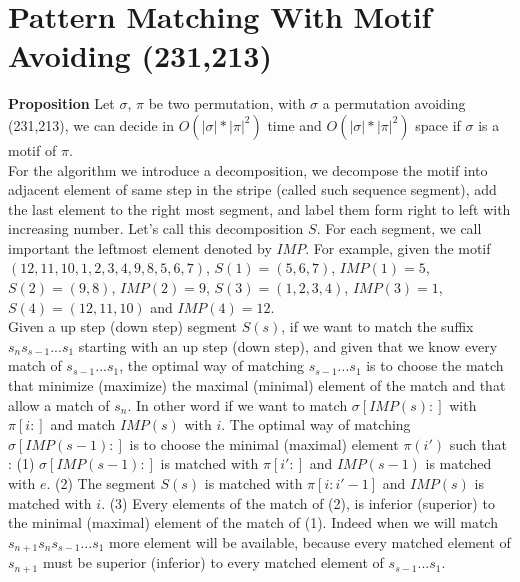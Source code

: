 \documentclass[a4paper]{llncs}
\newcommand{\ptext}{\pi}
\newcommand{\pmotif}{\sigma}
\newcounter{num}
\newcommand{\num}{\stepcounter{num} }
\begin{document}
		
		\section{Pattern Matching With Motif Avoiding (231,213)}	

			\textbf{Proposition  \num \thenum} Let $\pmotif$, $\ptext$ 
			be two permutation,
			with  $\pmotif$ a permutation avoiding (231,213), 
			we can decide in $O(|\pmotif|*|\ptext|^2)$ time
			and $O(|\pmotif|*|\ptext|^2)$ space
			if $\pmotif$ 
			is a motif of $\ptext$.\\
			
			
			For the algorithm we introduce a decomposition,
			we decompose the motif into
			adjacent element of same step in the stripe 
			(called such sequence segment),
			add the last element to the right most segment,
			and label them form right to left
			with increasing number.
			Let's call this decomposition $S$.
			For each segment, we call important 
			the leftmost element denoted by $IMP$.
			For example, given the motif $(12,11,10,1,2,3,4,9,8,5,6,7)$,
			$S(1)=(5,6,7)$, $IMP(1)=5$, 
			$S(2)=(9,8)$, $IMP(2)=9$, 
			$S(3)=(1,2,3,4)$, $IMP(3)=1$, 
			$S(4)=(12,11,10)$ and $IMP(4)=12$.\\
			
			Given a up step (down step) segment $S(s)$,
			if we want to
			match the suffix $s_ns_{s-1}...s_1$
			starting with an up step (down step),
			and given that we know every
			match of $s_{s-1}...s_1$,
			the optimal way of matching
			$s_{s-1}...s_1$
			is to choose the match
			that minimize (maximize)
			the maximal (minimal)
			element of the match
			and that allow a match
			of $s_n$.			
			In other word if we want to match 
			$\pmotif[IMP(s):]$
			with $\ptext[i:]$
			and match $IMP(s)$
			with $i$.
			The optimal way
			of matching
			$\pmotif[IMP(s-1):]$
			is to choose the
			minimal (maximal) element $\ptext(i')$
			such that :
			(1) $\pmotif[IMP(s-1):]$ is matched with $\ptext[i':]$
			and $IMP(s-1)$ is matched with $e$.
			(2) The segment $S(s)$ is matched with $\ptext[i:i'-1]$
			and $IMP(s)$ is matched with $i$.
			(3) Every elements of the match of (2),
			is inferior (superior) to the minimal (maximal) element of the match of (1).
			Indeed when we will 
			match $s_{n+1}s_ns_{s-1}...s_1$
			more element will be available,
			because every matched 
			element of $s_{n+1}$
			must be superior (inferior)
			to every matched element
			of $s_{s-1}...s_1$.\\
			  
\end{document}
